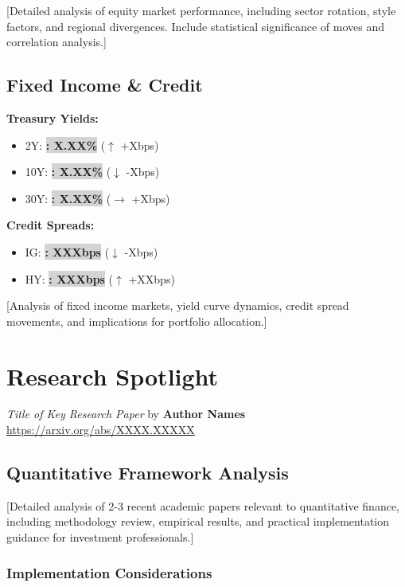 \documentclass[11pt,a4paper]{article}
\newcommand{\metric}[2]{\colorbox{lightgray}{\textbf{#1: #2}}}
\newcommand{\up}[1]{\textcolor{successgreen}{$\uparrow$ #1}}
\newcommand{\down}[1]{\textcolor{dangerred}{$\downarrow$ #1}}
\newcommand{\flat}[1]{\textcolor{mediumgray}{$\rightarrow$ #1}}
\newcommand{\researchcite}[3]{%
    \textit{#1} by \textbf{#2}\\
    \href{#3}{\textcolor{accentblue}{\footnotesize #3}}
}
\newcommand{\starttwocol}{\begin{multicols}{2}}
\newcommand{\endtwocol}{\end{multicols}}
\begin{document}
[Detailed analysis of equity market performance, including sector rotation, style factors, and regional divergences. Include statistical significance of moves and correlation analysis.]

\subsection{Fixed Income \& Credit}

\starttwocol
\textbf{Treasury Yields:}
\begin{itemize}[leftmargin=*]
    \item 2Y: \metric{}{X.XX\%} (\up{+Xbps})
    \item 10Y: \metric{}{X.XX\%} (\down{-Xbps})
    \item 30Y: \metric{}{X.XX\%} (\flat{+Xbps})
\end{itemize}

\textbf{Credit Spreads:}
\begin{itemize}[leftmargin=*]
    \item IG: \metric{}{XXXbps} (\down{-Xbps})
    \item HY: \metric{}{XXXbps} (\up{+XXbps})
\end{itemize}
\endtwocol

[Analysis of fixed income markets, yield curve dynamics, credit spread movements, and implications for portfolio allocation.]

\section{Research Spotlight}

\begin{research}
\researchcite{Title of Key Research Paper}{Author Names}{https://arxiv.org/abs/XXXX.XXXXX}
\end{research}

\subsection{Quantitative Framework Analysis}

[Detailed analysis of 2-3 recent academic papers relevant to quantitative finance, including methodology review, empirical results, and practical implementation guidance for investment professionals.]

\subsubsection{Implementation Considerations}
\end{document}
